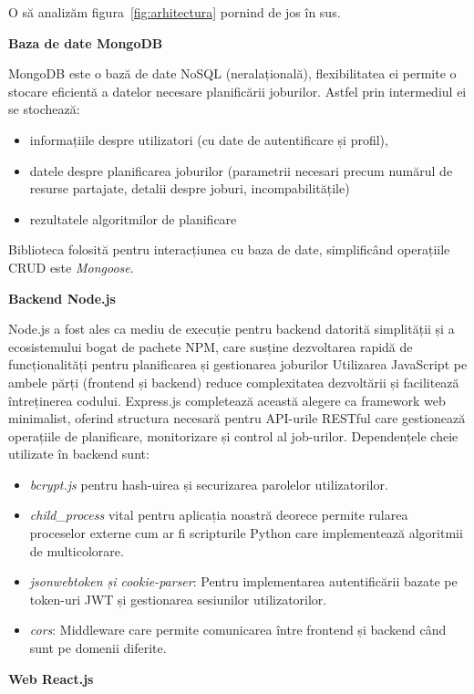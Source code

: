 O să analizăm figura~\ref{fig:arhitectura} pornind de jos în sus.

{\bf Baza de date MongoDB}

MongoDB este o bază de date NoSQL (neralațională), flexibilitatea ei permite o stocare eficientă a datelor necesare planificării joburilor. Astfel prin intermediul ei se stochează:
\begin{itemize}
  \item informațiile despre utilizatori (cu date de autentificare și profil),
  \item datele despre planificarea joburilor (parametrii necesari precum numărul de resurse partajate, detalii despre joburi, incompabilitățile)
  \item rezultatele algoritmilor de planificare
\end{itemize}
Biblioteca folosită pentru interacțiunea cu baza de date, simplificând operațiile CRUD este \textit{Mongoose}.

{\bf Backend Node.js}

Node.js a fost ales ca mediu de execuție pentru backend datorită simplității și a ecosistemului bogat de pachete NPM, care susține dezvoltarea rapidă de funcționalități pentru planificarea și gestionarea joburilor Utilizarea JavaScript pe ambele părți (frontend și backend) reduce complexitatea dezvoltării și facilitează întreținerea codului.
Express.js completează această alegere ca framework web minimalist, oferind structura necesară pentru API-urile RESTful care gestionează operațiile de planificare, monitorizare și control al job-urilor. 
Dependențele cheie utilizate în backend sunt:
\begin{itemize}
  \item \textit{bcrypt.js} pentru hash-uirea și securizarea parolelor utilizatorilor.
  \item \textit{child\_process} vital pentru aplicația noastră deorece permite rularea proceselor externe cum ar fi scripturile Python care implementează algoritmii de multicolorare.
  \item \textit{jsonwebtoken și cookie-parser}: Pentru implementarea autentificării bazate pe token-uri JWT și gestionarea sesiunilor utilizatorilor.
  \item \textit{cors}: Middleware care permite comunicarea între frontend și backend când sunt pe domenii diferite.
\end{itemize}

{\bf Web React.js}

